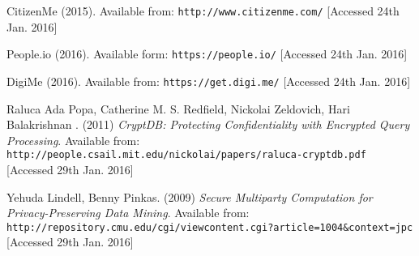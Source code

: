 \begin{thebibliography}{9}
CitizenMe (2015). Available from: \texttt{http://www.citizenme.com/} [Accessed 24th Jan. 2016]

People.io (2016). Available form: \texttt{https://people.io/} [Accessed 24th Jan. 2016]

DigiMe (2016). Available from:
\texttt{https://get.digi.me/} [Accessed 24th Jan. 2016]

Raluca Ada Popa, Catherine M. S. Redfield, Nickolai Zeldovich, Hari Balakrishnan . (2011) \textit{CryptDB: Protecting Confidentiality with Encrypted Query Processing}. Available from: 
\\\texttt{http://people.csail.mit.edu/nickolai/papers/raluca-cryptdb.pdf} [Accessed 29th Jan. 2016]

Yehuda Lindell, Benny Pinkas. (2009) \textit{Secure Multiparty Computation for Privacy-Preserving Data Mining}. Available from:
\\\texttt{http://repository.cmu.edu/cgi/viewcontent.cgi?article=1004\&context=jpc} [Accessed 29th Jan. 2016]

\end{thebibliography}
